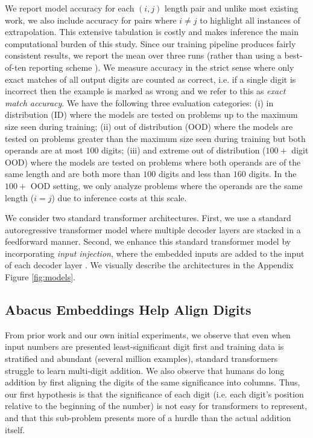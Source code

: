 \documentclass{article}
\begin{document}
We report model accuracy for each $(i,j)$ length pair and unlike most existing work, we also include accuracy for pairs where $i\neq j$ to highlight all instances of extrapolation. 
This extensive tabulation is costly and makes inference the main computational burden of this study. 
Since our training pipeline produces fairly consistent results, we report the mean over three runs (rather than using a best-of-ten reporting scheme \citep{zhou2024transformers}). 
We measure accuracy in the strict sense where only exact matches of all output digits are counted as correct, i.e. if a single digit is incorrect then the example is marked as wrong and we refer to this as \emph{exact match accuracy}.
We have the following three evaluation categories:
(i) in distribution (ID) where the models are tested on problems up to the maximum size seen during training; (ii) out of distribution (OOD) where the models are tested on problems greater than the maximum size seen during training but both operands are at most $100$ digits; (iii) and extreme out of distribution ($100+$ digit OOD) where the models are tested on problems where both operands are of the same length and are both more than $100$ digits and less than $160$ digits.
In the $100+$ OOD setting, we only analyze problems where the operands are the same length ($i = j$) due to inference costs at this scale.

We consider two standard transformer architectures.
First, we use a standard autoregressive transformer model where multiple decoder layers are stacked in a feedforward manner. 
Second, we enhance this standard transformer model by incorporating \emph{input injection}, where the embedded inputs are added to the input of each decoder layer \citep{ma2022mega,bansal2022endtoend, anil2022path}.
We visually describe the architectures in the Appendix Figure \ref{fig:models}. 

\subsection{Abacus Embeddings Help Align Digits}

From prior work and our own initial experiments, we observe that even when input numbers are presented least-significant digit first and training data is stratified and abundant (several million examples), standard transformers struggle to learn multi-digit addition.
We also observe that humans do long addition by first aligning the digits of the same significance into columns. 
Thus, our first hypothesis is that the significance of each digit (i.e. each digit's position relative to the beginning of the number) is not easy for transformers to represent, and that this sub-problem presents more of a hurdle than the actual addition itself.
\end{document}
